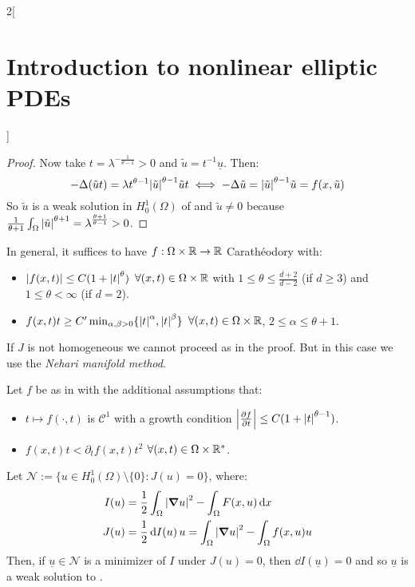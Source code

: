 \documentclass[../../../main_math.tex]{subfiles}
\begin{document}
\begin{multicols}{2}[\section{Introduction to nonlinear elliptic PDEs}]
\begin{proof}
    Now take $t=\lambda^{-\frac{1}{\theta-1}}>0$ and $\tilde{u}=t^{-1}\underline{u}$. Then:
    $$
      -\Delta(\tilde{u}t)=\lambda t^{\theta-1}\abs{\tilde{u}}^{\theta-1}\tilde{u}t\iff -\Delta \tilde{u}= \abs{\tilde{u}}^{\theta-1}\tilde{u}=f(x,\tilde{u})
    $$
    So $\tilde{u}$ is a weak solution in $H_0^1(\Omega)$ of  and $\tilde{u}\ne 0$ because $\frac{1}{\theta+1}\int_\Omega \abs{\tilde{u}}^{\theta+1}=\lambda^{\frac{\theta+1}{\theta-1}}>0$.
  \end{proof}
  \begin{remark}
    In general, it suffices to have $f:\Omega\times \mathbb{R}\to\mathbb{R}$ Carathéodory with:
    \begin{itemize}
      \item $\abs{f(x,t)}\leq C(1+\abs{t}^\theta)$ $\forall (x,t)\in \Omega\times \mathbb{R}$ with $1\leq \theta\leq \frac{d+2}{d-2}$ (if $d\geq 3$) and $1\leq \theta<\infty$ (if $d=2$).
      \item $f(x,t)t\geq C'\min_{\alpha,\beta>0}\{\abs{t}^\alpha,\abs{t}^\beta\}$ $\forall (x,t)\in \Omega\times \mathbb{R}$, $2\leq \alpha\leq \theta+1$.
    \end{itemize}
  \end{remark}
  \begin{remark}
    If $J$ is not homogeneous we cannot proceed as in the proof. But in this case we use the \emph{Nehari manifold method}.
  \end{remark}
  \begin{proposition}
    Let $f$ be as in  with the additional assumptions that:
    \begin{itemize}
      \item $t\mapsto f(\cdot,t)$ is $\mathcal{C}^1$ with a growth condition $\abs{\pdv{f}{t}}\leq C(1+\abs{t}^{\theta-1})$.
      \item $f(x,t)t< \partial_tf(x,t)t^2$ $\forall (x,t)\in \Omega\times \mathbb{R}^*$.
    \end{itemize}
    Let $\mathcal{N}:=\{u\in H_0^1(\Omega)\setminus\{0\}:J(u)=0\}$, where:
    \begin{align*}
      I(u) & =\frac{1}{2}\int_\Omega \abs{\grad u}^2-\int_\Omega F(x,u)\dd{x}           \\
      J(u) & =\frac{1}{2} \dd{I(u)}u = \int_\Omega \abs{\grad u}^2 -\int_\Omega f(x,u)u
    \end{align*}
    Then, if $\underline{u}\in\mathcal{N}$ is a minimizer of $I$ under $J(u)=0$, then $\dd{I(\underline{u})}=0$ and so $\underline{u}$ is a weak solution to .

\end{proposition}
\end{multicols}
\end{document}
